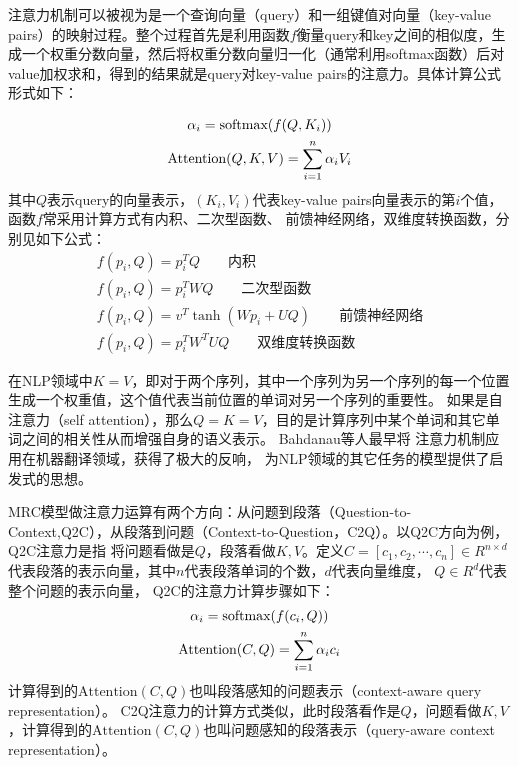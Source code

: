 注意力机制可以被视为是一个查询向量（query）和一组键值对向量（key-value pairs）的映射过程。整个过程首先是利用函数$f$衡量query和key之间的相似度，生成一个权重分数向量，然后将权重分数向量归一化（通常利用softmax函数）后对value加权求和，得到的结果就是query对key-value pairs的注意力。具体计算公式形式如下：

\begin{gather}
\alpha_i=\text{softmax}(f(Q,K_i)) \notag \\
\text{Attention}(Q,K,V)=\sum_{i=1}^{n}\alpha_iV_i
\end{gather}
其中$Q$表示query的向量表示，$(K_i,V_i)$代表key-value pairs向量表示的第$i$个值，
函数$f$常采用计算方式有内积、二次型函数、
前馈神经网络，双维度转换函数，分别见如下公式：
\begin{gather}
f(p_i,Q)=p_i^TQ \qquad \text{内积} \\
f(p_i,Q)=p_i^TWQ\qquad \text{二次型函数}\\
f(p_i,Q)=v^T\tanh(Wp_i+UQ)\qquad \text{前馈神经网络} \\
f(p_i,Q)=p_i^TW^TUQ \qquad \text{双维度转换函数}
\end{gather}

在NLP领域中$K=V$，即对于两个序列，其中一个序列为另一个序列的每一个位置生成一个权重值，这个值代表当前位置的单词对另一个序列的重要性。
如果是自注意力（self attention），那么$Q=K=V$，目的是计算序列中某个单词和其它单词之间的相关性从而增强自身的语义表示。
Bahdanau等人最早将
注意力机制应用在机器翻译领域，获得了极大的反响，
为NLP领域的其它任务的模型提供了启发式的思想。

MRC模型做注意力运算有两个方向：从问题到段落（Question-to-Context,Q2C），从段落到问题（Context-to-Question，C2Q）。以Q2C方向为例，Q2C注意力是指
将问题看做是$Q$，段落看做$K,V$。定义$C=[c_1,c_2,\cdots,c_n] \in R^{n\times d}$代表段落的表示向量，其中$n$代表段落单词的个数，$d$代表向量维度，
$Q\in R^{d}$代表整个问题的表示向量，
Q2C的注意力计算步骤如下：
\begin{gather}
\alpha_i=\text{softmax}(f(c_i,Q)) \notag \\
\text{Attention}(C,Q)=\sum_{i=1}^{n}\alpha_{i}c_i
\end{gather}
计算得到的$\text{Attention}(C,Q)$也叫段落感知的问题表示（context-aware query representation）。
C2Q注意力的计算方式类似，此时段落看作是$Q$，问题看做$K,V$，计算得到的$\text{Attention}(C,Q)$也叫问题感知的段落表示（query-aware context representation）。

